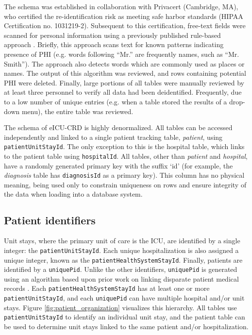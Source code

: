 \documentclass[english]{article}
\newcommand{\colname}[1]{\texttt{#1}}
\newcommand{\tblname}[1]{\emph{#1}}
\begin{document}
The schema was established in collaboration with Privacert (Cambridge, MA), who certified the re-identification risk as meeting safe harbor standards (HIPAA Certification no. 1031219-2). Subsequent to this certification, free-text fields were scanned for personal information using a previously published rule-based approach \cite{neamatullah2008automated}. Briefly, this approach scans text for known patterns indicating presence of PHI (e.g. words following ``Mr.'' are frequently names, such as ``Mr. Smith''). The approach also detects words which are commonly used as places or names. The output of this algorithm was reviewed, and rows containing potential PHI were deleted. Finally, large portions of all tables were manually reviewed by at least three personnel to verify all data had been deidentified. Frequently, due to a low number of unique entries (e.g. when a table stored the results of a drop-down menu), the entire table was reviewed.

The schema of eICU-CRD is highly denormalized. All tables can be accessed independently and linked to a single patient tracking table, \tblname{patient}, using \colname{patientUnitStayId}. The only exception to this is the hospital table, which links to the patient table using \colname{hospitalId}. All tables, other than \tblname{patient} and \tblname{hospital}, have a randomly generated primary key with the suffix `id' (for example, the \tblname{diagnosis} table has \colname{diagnosisId} as a primary key). This column has no physical meaning, being used only to constrain uniqueness on rows and ensure integrity of the data when loading into a database system.

\subsection*{Patient identifiers}\label{patient-identifiers}

Unit stays, where the primary unit of care is the ICU, are identified by a single integer: the \colname{patientUnitStayId}. Each unique hospitalization is also assigned a unique integer, known as the \colname{patientHealthSystemStayId}. Finally, patients are identified by a \colname{uniquePid}. Unlike the other identifiers, \colname{uniquePid} is generated using an algorithm based upon prior work on linking disparate patient medical records \cite{finney2011efficient}.
Each \colname{patientHealthSystemStayId} has at least one or more \colname{patientUnitStayId}, and each \colname{uniquePid} can have multiple hospital and/or unit stays. Figure \ref{fig:patient_organization} visualizes this hierarchy. All tables use
\colname{patientUnitStayId} to identify an individual unit stay, and the patient table can be used to determine unit stays linked to the same patient and/or hospitalization.
\end{document}
